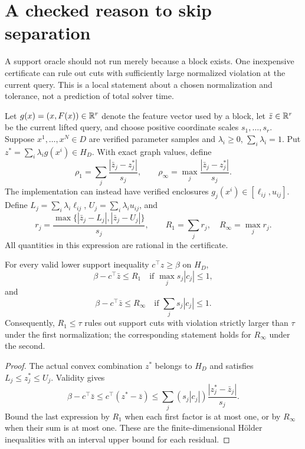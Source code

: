 \section{A checked reason to skip separation}\label{sec:screening}

A support oracle should not run merely because a block exists. One
inexpensive certificate can rule out cuts with sufficiently large
normalized violation at the current query. This is a local statement
about a chosen normalization and tolerance, not a prediction of total
solver time.

Let $g(x)=(x,F(x))\in\mathbb R^r$ denote the feature vector used by a block,
let $\bar z\in\mathbb R^r$ be the current lifted query, and choose positive
coordinate scales $s_1,\ldots,s_r$. Suppose $x^1,\ldots,x^N\in D$
are verified parameter samples and $\lambda_i\ge0$,
$\sum_i\lambda_i=1$. Put $z^*=\sum_i\lambda_i g(x^i)\in H_D$.
With exact graph values, define
\[
\rho_1=\sum_j\frac{|\bar z_j-z_j^*|}{s_j},\qquad
\rho_\infty=\max_j\frac{|\bar z_j-z_j^*|}{s_j}.
\]
The implementation can instead have verified enclosures
$g_j(x^i)\in[\ell_{ij},u_{ij}]$. Define
$L_j=\sum_i\lambda_i\ell_{ij}$, $U_j=\sum_i\lambda_i u_{ij}$, and
\begin{equation}\label{eq:screen}
r_j=\frac{\max\{|\bar z_j-L_j|,|\bar z_j-U_j|\}}{s_j},
\qquad R_1=\sum_jr_j,\quad R_\infty=\max_jr_j.
\end{equation}
All quantities in this expression are rational in the certificate.

\begin{theorem}\label{thm:screen}
For every valid lower support inequality $c^\top z\ge\beta$ on $H_D$,
\[
\beta-c^\top\bar z\le R_1
\quad\text{if }\max_j s_j|c_j|\le1,
\]
and
\[
\beta-c^\top\bar z\le R_\infty
\quad\text{if }\sum_j s_j|c_j|\le1.
\]
Consequently, $R_1\le\tau$ rules out support cuts with violation
strictly larger than $\tau$ under the first normalization; the
corresponding statement holds for $R_\infty$ under the second.
\end{theorem}
\begin{proof}
The actual convex combination $z^*$ belongs to $H_D$ and satisfies
$L_j\le z_j^*\le U_j$. Validity gives
\[
\beta-c^\top\bar z\le c^\top(z^*-\bar z)
\le\sum_j(s_j|c_j|)\frac{|z_j^*-\bar z_j|}{s_j}.
\]
Bound the last expression by $R_1$ when each first factor is at most
one, or by $R_\infty$ when their sum is at most one. These are the
finite-dimensional H\"older inequalities with an interval upper bound
for each residual.
\end{proof}

